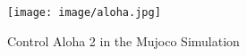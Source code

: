 \begin{figure}[h!]
    \centering
    \texttt{[image: image/aloha.jpg]}
    \caption{Control Aloha 2 in the Mujoco Simulation}
    \label{fig:aloha}
\end{figure}
